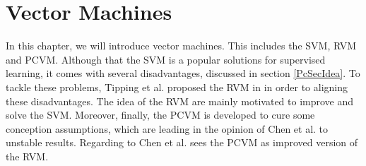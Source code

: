 \chapter{Vector Machines}\label{Pc}
In this chapter, we will introduce vector machines.
This includes the \ac{SVM}, \ac{RVM} and \ac{PCVM}.
Although that the \acs{SVM} is a popular solutions for supervised learning, it comes with several disadvantages, discussed in section \ref{PcSecIdea}. 
To tackle these problems, Tipping et al. proposed the \acs{RVM} in \cite{Tipping.2001} in order to aligning these disadvantages.
The idea of the \acs{RVM} are mainly motivated to improve and solve the \acs{SVM}.\cite[p. 1-2]{Tipping.2001}
Moreover, finally, the \acs{PCVM} is developed to cure some conception assumptions, which are leading in the opinion of Chen et al. to unstable results.
Regarding to Chen et al. sees the \acs{PCVM} as improved version of the \acs{RVM}.\cite{Chen.2009}\newline
